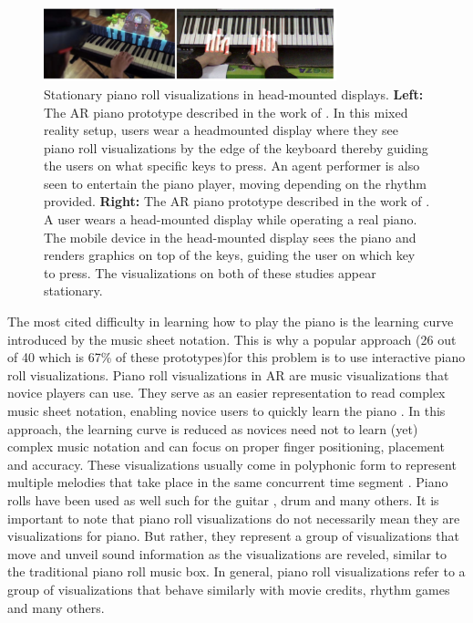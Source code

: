 \documentclass[sigchi, review]{acmart}
\begin{document}
\begin{figure}[h]
    \centering
    \includegraphics[width=8.5cm]{figures/dashuang.png}
    \caption{Stationary piano roll visualizations in head-mounted displays. \textbf{Left:} The AR piano prototype described in the work of \citet{das2017music}. In this mixed reality setup, users wear a headmounted display where they see piano roll visualizations by the edge of the keyboard thereby guiding the users on what specific keys to press. An agent performer is also seen to entertain the piano player, moving depending on the rhythm provided. \textbf{Right:} The AR piano prototype described in the work of \citet{huang2011piano}. A user wears a head-mounted display while operating a real piano. The mobile device in the head-mounted display sees the piano and renders graphics on top of the keys, guiding the user on which key to press. The visualizations on both of these studies appear stationary.  }
    \label{fig:dashuang}
\end{figure}

The most cited difficulty in learning how to play the piano is the learning curve introduced by the music sheet notation. This is why a popular approach (26 out of 40 \textendash  which is 67\% of these prototypes)for this problem is to use interactive piano roll visualizations. Piano roll visualizations in AR are music visualizations that novice players can use. They serve as an easier representation to read complex music sheet notation, enabling novice users to quickly learn the piano \cite{walder2016modelling}. In this approach, the learning curve is reduced as novices need not to learn (yet) complex music notation and can focus on proper finger positioning, placement and accuracy. These visualizations usually come in polyphonic form to represent multiple melodies that take place in the same concurrent time segment \cite{ciuha2010visualization}.  Piano rolls have been used as well such for the guitar \cite{biamonte2010musical}, drum \cite{rossignol2015alternate} and many others. It is important to note that piano roll visualizations do not necessarily mean they are visualizations for piano. But rather, they represent a group of visualizations that move and unveil sound information as the visualizations are reveled, similar to the traditional piano roll music box. In general, piano roll visualizations refer to a group of visualizations that behave similarly with movie credits, rhythm games and many others. 
\end{document}
